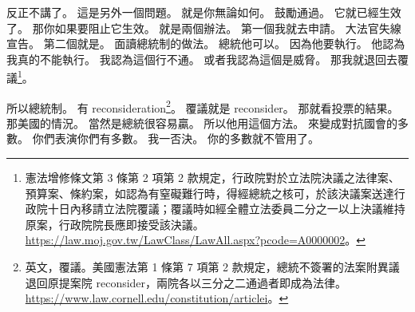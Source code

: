 \hypertarget{w01:cue:2271}{}反正不講了。
\hypertarget{w01:cue:2272}{}這是另外一個問題。
\hypertarget{w01:cue:2273}{}就是你無論如何。
\hypertarget{w01:cue:2274}{}鼓勵通過。
\hypertarget{w01:cue:2275}{}它就已經生效了。
\hypertarget{w01:cue:2276}{}那你如果要阻止它生效。
\hypertarget{w01:cue:2277}{}就是兩個辦法。
\hypertarget{w01:cue:2278}{}第一個我就去申請。
\hypertarget{w01:cue:2279}{}大法官失線宣告。
\hypertarget{w01:cue:2280}{}第二個就是。
\hypertarget{w01:cue:2281}{}面讀總統制的做法。
\hypertarget{w01:cue:2282}{}總統他可以。
\hypertarget{w01:cue:2283}{}因為他要執行。
\hypertarget{w01:cue:2284}{}他認為我真的不能執行。
\hypertarget{w01:cue:2285}{}我認為這個行不通。
\hypertarget{w01:cue:2286}{}或者我認為這個是威脅。
\hypertarget{w01:cue:2287}{}那我就退回去覆議\footnote{憲法增修條文第 3 條第 2 項第 2 款規定，行政院對於立法院決議之法律案、預算案、條約案，如認為有窒礙難行時，得經總統之核可，於該決議案送達行政院十日內移請立法院覆議；覆議時如經全體立法委員二分之一以上決議維持原案，行政院院長應即接受該決議。\url{https://law.moj.gov.tw/LawClass/LawAll.aspx?pcode=A0000002}。}。

\hypertarget{w01:cue:2288}{}所以總統制。
\hypertarget{w01:cue:2289}{}有 reconsideration\footnote{英文，覆議。美國憲法第 1 條第 7 項第 2 款規定，總統不簽署的法案附異議退回原提案院 reconsider，兩院各以三分之二通過者即成為法律。\url{https://www.law.cornell.edu/constitution/articlei}。}。
\hypertarget{w01:cue:2290}{}覆議就是 reconsider。
\hypertarget{w01:cue:2291}{}那就看投票的結果。
\hypertarget{w01:cue:2292}{}那美國的情況。
\hypertarget{w01:cue:2293}{}當然是總統很容易贏。
\hypertarget{w01:cue:2294}{}所以他用這個方法。
\hypertarget{w01:cue:2295}{}來變成對抗國會的多數。
\hypertarget{w01:cue:2296}{}你們表演你們有多數。
\hypertarget{w01:cue:2297}{}我一否決。
\hypertarget{w01:cue:2298}{}你的多數就不管用了。

